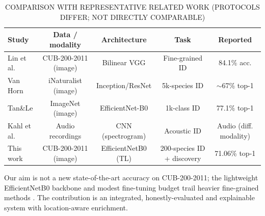 \documentclass[conference]{IEEEtran}
\begin{document}
\begin{table}[t]
\centering
\caption{COMPARISON WITH REPRESENTATIVE RELATED WORK (PROTOCOLS DIFFER; NOT DIRECTLY COMPARABLE)}
\label{tab:I}
\footnotesize
\begin{tabular}{lcccc}
\toprule
\textbf{Study} & \textbf{Data / modality} & \textbf{Architecture} & \textbf{Task} & \textbf{Reported} \\
\midrule
Lin et al. \cite{ref8} & CUB-200-2011 (image) & Bilinear VGG & Fine-grained ID & 84.1\% acc. \\
Van Horn \cite{ref7} & iNaturalist (image) & Inception/ResNet & 5k-species ID & $\sim$67\% top-1 \\
Tan\&Le \cite{ref4} & ImageNet (image) & EfficientNet-B0 & 1k-class ID & 77.1\% top-1 \\
Kahl et al. \cite{ref15} & Audio recordings & CNN (spectrogram) & Acoustic ID & Audio (diff. modality) \\
This work & CUB-200-2011 (image) & EfficientNetB0 (TL) & 200-species ID + discovery & 71.06\% top-1 \\
\bottomrule
\end{tabular}
\end{table}
Our aim is not a new state-of-the-art accuracy on CUB-200-2011; the lightweight EfficientNetB0 backbone and modest fine-tuning budget trail heavier fine-grained methods \cite{ref8}. The contribution is an integrated, honestly-evaluated and explainable system with location-aware enrichment.
\end{document}
